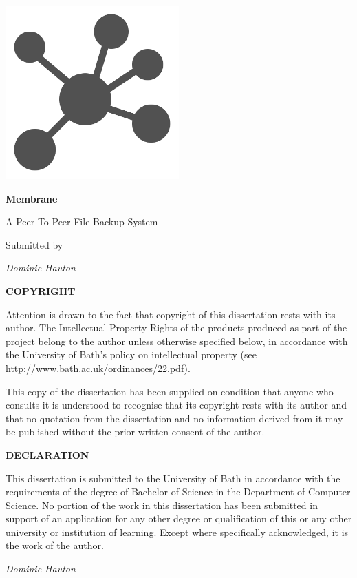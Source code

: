 \documentclass[11pt, a4paper, twoside]{report}
\begin{document}
\begin{titlepage}
	\centering
	\includegraphics[width=0.5\textwidth]{membrane-logo}\par\vspace{1cm}
	{\huge\bfseries Membrane\par A Peer-To-Peer File Backup System\par}
	\vspace{1cm}
	Submitted by 
	{\Large\itshape Dominic Hauton\par}
	
	
	\vfill
	
	
	\justifying
	\noindent
	\textbf{COPYRIGHT}
	
	\vspace{0.25cm}
	\noindent
	Attention is drawn to the fact that copyright of this dissertation rests with its author. The Intellectual Property Rights of the products produced as part of the project belong to the author unless otherwise specified below, in accordance with the University of Bath’s policy on intellectual property (see http://www.bath.ac.uk/ordinances/22.pdf).
	
	\vspace{0.5cm}
	\noindent
	This copy of the dissertation has been supplied on condition that anyone who consults it is understood to recognise that its copyright rests with its author and that no quotation from the dissertation and no information derived from it may be published without the prior written consent of the author.
	
	\vspace{0.5cm}
	\noindent
	\textbf{DECLARATION}
	
	\vspace{0.25cm}
	\noindent
	This dissertation is submitted to the University of Bath in accordance with the requirements of the degree of Bachelor of Science in the Department of Computer Science. No portion of the work in this dissertation has been submitted in support of an application for any other degree or qualification of this or any other university or institution of learning. Except where specifically acknowledged, it is the work of the author.
	
	\vspace{0.25cm}
	\noindent
	\emph{Dominic Hauton}
	
\end{titlepage}
\end{document}
